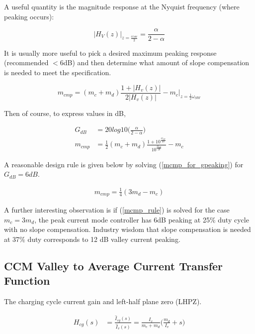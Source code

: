 \documentclass{scrartcl}
\begin{document}
		A useful quantity is the magnitude response at the Nyquist frequency (where peaking occurs):		
		
		\begin{equation}
		\bigg|H_V(z) \bigg|_{z=\frac{\omega_{SW}}{2}} =  \dfrac{\alpha}{2 - \alpha} \label{cpm_peaking}
		\end{equation}
		
		It is usually more useful to pick a desired maximum peaking response (recommended $<6$dB) and then determine what amount of slope compensation is needed to meet the specification.

		\begin{equation}
		m_{cmp} = (m_c + m_d) \frac{1 + |H_v(z)|}{2|H_v(z)|} - m_c \bigg|_{z=\frac{1}{2}\omega_{SW}}
		\end{equation}
		
		Then of course, to express values in dB,
		
		\begin{align}
		G_{dB} &= 20log10\bigg(\frac{\alpha}{2-\alpha}\bigg)\label{Gpeaking}\\
		m_{cmp} &= \frac{1}{2}(m_c + m_d) \frac{1 + 10^\frac{G_{dB}}{20}}{10^\frac{G_{dB}}{20}}  - m_c \label{mcmp_for_gpeaking}
		\end{align}
		
		A reasonable design rule is given below by solving (\ref{mcmp_for_gpeaking}) for $G_{dB} = 6 dB$.
		
		\begin{align}
			m_{cmp} = \frac{1}{4}(3m_d-m_c) \label{mcmp_rule}
		\end{align}
		
		A further interesting observation is if (\ref{mcmp_rule}) is solved for the case $m_c = 3m_d$, the peak current mode controller has 6dB peaking at 25$\%$ duty cycle with no slope compensation. Industry wisdom that slope compensation is needed at 37$\%$ duty corresponds to 12 dB valley current peaking.
		
		\subsection{CCM Valley to Average Current Transfer Function}
		The charging cycle current gain and left-half plane zero (LHPZ).

		\begin{align}
		H_{cg} (s) &= \frac{\hat{I}_{cg}(s)}{\hat{I}_{v}(s)} =\frac{I_{v}}{m_c + m_d}
		\big (\frac{m_d}{I_{v}} + s \big )
		\label{LHPZ_s_raw}
		\end{align}
		
\end{document}
